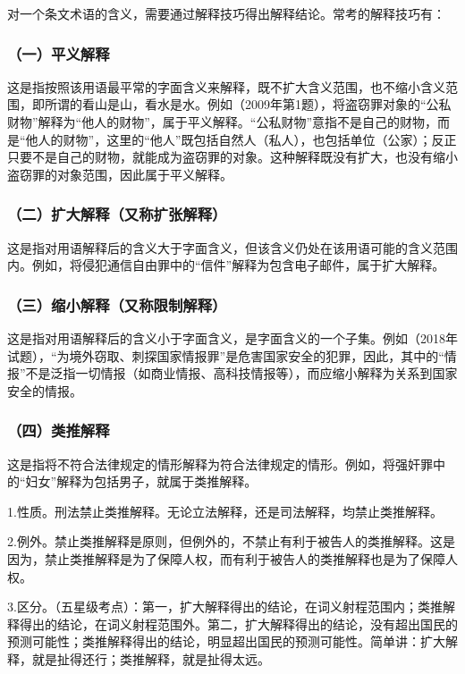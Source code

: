 对一个条文术语的含义，需要通过解释技巧得出解释结论。常考的解释技巧有：

\subsubsection*{（一）平义解释}

这是指按照该用语最平常的字面含义来解释，既不扩大含义范围，也不缩小含义范围，即所谓的看山是山，看水是水。例如（2009年第1题），将盗窃罪对象的“公私财物”解释为“他人的财物”，属于平义解释。“公私财物”意指不是自己的财物，而是“他人的财物”，这里的“他人”既包括自然人（私人），也包括单位（公家）；反正只要不是自己的财物，就能成为盗窃罪的对象。这种解释既没有扩大，也没有缩小盗窃罪的对象范围，因此属于平义解释。

\subsubsection*{（二）扩大解释（又称扩张解释）}

这是指对用语解释后的含义大于字面含义，但该含义仍处在该用语可能的含义范围内。例如，将侵犯通信自由罪中的“信件”解释为包含电子邮件，属于扩大解释。

\subsubsection*{（三）缩小解释（又称限制解释）}

这是指对用语解释后的含义小于字面含义，是字面含义的一个子集。例如（2018年试题），“为境外窃取、刺探国家情报罪”是危害国家安全的犯罪，因此，其中的“情报”不是泛指一切情报（如商业情报、高科技情报等），而应缩小解释为关系到国家安全的情报。

\subsubsection*{（四）类推解释}

这是指将不符合法律规定的情形解释为符合法律规定的情形。例如，将强奸罪中的“妇女”解释为包括男子，就属于类推解释。

1.性质。刑法禁止类推解释。无论立法解释，还是司法解释，均禁止类推解释。

2.例外。禁止类推解释是原则，但例外的，不禁止有利于被告人的类推解释。这是因为，禁止类推解释是为了保障人权，而有利于被告人的类推解释也是为了保障人权。

3.区分。（五星级考点）：第一，扩大解释得出的结论，在词义射程范围内；类推解释得出的结论，在词义射程范围外。第二，扩大解释得出的结论，没有超出国民的预测可能性；类推解释得出的结论，明显超出国民的预测可能性。简单讲：扩大解释，就是扯得还行；类推解释，就是扯得太远。

